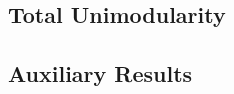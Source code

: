 \begin{definition}
  \label{def:2_elem_ext}
\end{definition}


\subsection{Total Unimodularity}

\begin{definition}[TU matrix]
  \label{def:tu_matrix}
\end{definition}

\subsection{Auxiliary Results}

\begin{theorem}
  \label{thm:Menger}
\end{theorem}
